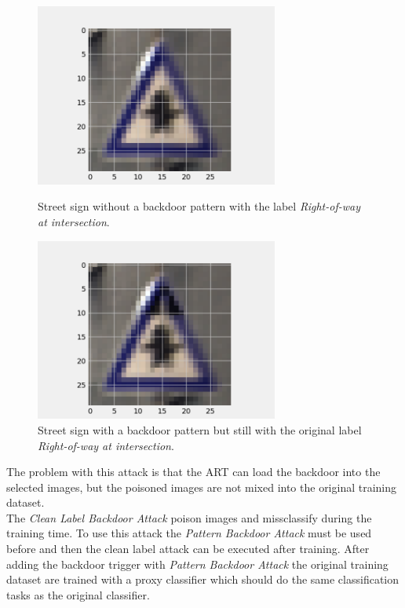 \begin{figure}[!ht]
  \centering
  \begin{minipage}[b]{0.4\textwidth}
    \includegraphics[width=8cm]{pictures/original_example.png}
    \caption{Street sign without a backdoor pattern with the label \textit{Right-of-way at intersection}.}
    \label{fig:original_example}
  \end{minipage}
  \hfill
  \begin{minipage}[b]{0.4\textwidth}
    \includegraphics[width=8cm]{pictures/poisoned_example.png}
    \caption{Street sign with a backdoor pattern but still with the original label \textit{Right-of-way at intersection}.}
    \label{fig:poisoned_example}
  \end{minipage}
\end{figure}

The problem with this attack is that the ART can load the backdoor into the selected images, but the poisoned images are not mixed into the original training dataset. \\
The \textit{Clean Label Backdoor Attack} \cite{turner2018clean} poison images and missclassify during the training time. To use this attack the \textit{Pattern Backdoor Attack} must be
used before and then the clean label attack can be executed after training. After adding the backdoor trigger with \textit{Pattern Backdoor Attack} the original training dataset are trained
with a proxy classifier which should do the same classification tasks as the original classifier.


